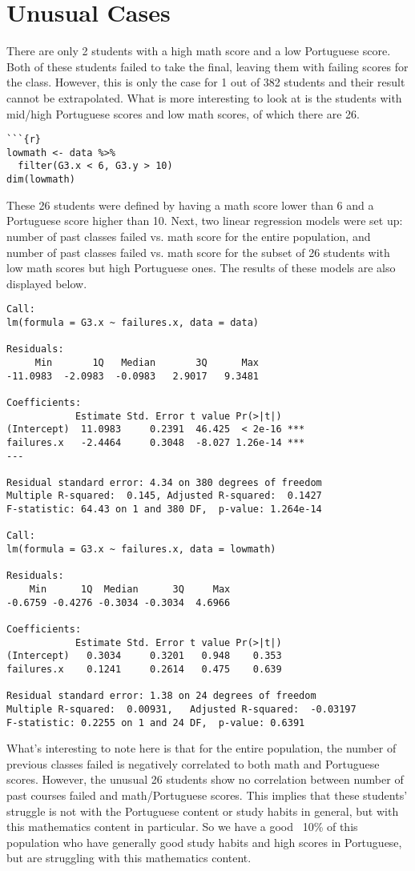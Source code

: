 \documentclass{article}
\begin{document}
\section{Unusual Cases}
There are only 2 students with a high math score and a low Portuguese score. Both of these students failed to take the final, leaving them with failing scores for the class. However, this is only the case for 1 out of 382 students and their result cannot be extrapolated. What is more interesting to look at is the students with mid/high Portuguese scores and low math scores, of which there are 26.
\begin{lstlisting}
```{r}
lowmath <- data %>%
  filter(G3.x < 6, G3.y > 10)
dim(lowmath)
\end{lstlisting}
These 26 students were defined by having a math score lower than 6 and a Portuguese score higher than 10. Next, two linear regression models were set up: number of past classes failed vs. math score for the entire population, and number of past classes failed vs. math score for the subset of 26 students with low math scores but high Portuguese ones. The results of these models are also displayed below.
\begin{lstlisting}
Call:
lm(formula = G3.x ~ failures.x, data = data)

Residuals:
     Min       1Q   Median       3Q      Max 
-11.0983  -2.0983  -0.0983   2.9017   9.3481 

Coefficients:
            Estimate Std. Error t value Pr(>|t|)    
(Intercept)  11.0983     0.2391  46.425  < 2e-16 ***
failures.x   -2.4464     0.3048  -8.027 1.26e-14 ***
---

Residual standard error: 4.34 on 380 degrees of freedom
Multiple R-squared:  0.145,	Adjusted R-squared:  0.1427 
F-statistic: 64.43 on 1 and 380 DF,  p-value: 1.264e-14

Call:
lm(formula = G3.x ~ failures.x, data = lowmath)

Residuals:
    Min      1Q  Median      3Q     Max 
-0.6759 -0.4276 -0.3034 -0.3034  4.6966 

Coefficients:
            Estimate Std. Error t value Pr(>|t|)
(Intercept)   0.3034     0.3201   0.948    0.353
failures.x    0.1241     0.2614   0.475    0.639

Residual standard error: 1.38 on 24 degrees of freedom
Multiple R-squared:  0.00931,	Adjusted R-squared:  -0.03197 
F-statistic: 0.2255 on 1 and 24 DF,  p-value: 0.6391
\end{lstlisting}
What's interesting to note here is that for the entire population, the number of previous classes failed is negatively correlated to both math and Portuguese scores. However, the unusual 26 students show no correlation between number of past courses failed and math/Portuguese scores. This implies that these students' struggle is not with the Portuguese content or study habits in general, but with this mathematics content in particular. So we have a good ~10\% of this population who have generally good study habits and high scores in Portuguese, but are struggling with this mathematics content.
\end{document}
